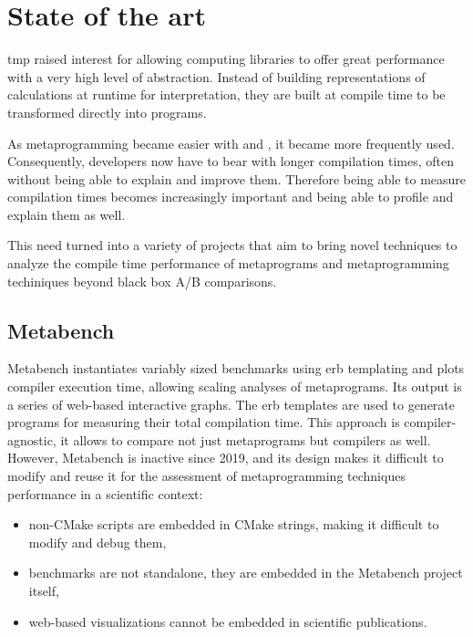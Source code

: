 \documentclass[../main]{subfiles}
\begin{document}
\section{
  State of the art
}

\cpp \gls{tmp} raised interest for allowing computing libraries
to offer great performance with a very high level of abstraction.
Instead of building representations of calculations at runtime for
interpretation, they are built at compile time to be transformed directly into
programs.

As metaprogramming became easier with  and ,
it became more frequently used.
Consequently, developers now have to bear with longer
compilation times, often without being able to explain and improve them.
Therefore being able to measure compilation times becomes increasingly important
and being able to profile and explain them as well.

This need turned into a variety of projects that aim to bring novel techniques
to analyze the compile time performance of \cpp metaprograms and metaprogramming
techiniques beyond black box A/B comparisons.

%

\subsection{
  Metabench
}

Metabench\cite{metabench} instantiates variably sized benchmarks using
\gls{erb} templating and plots compiler execution time, allowing
scaling analyses of metaprograms. Its output is a series of web-based
interactive graphs.
The \gls{erb} templates are used to generate \cpp programs for measuring their
total compilation time. This approach is compiler-agnostic, it allows to compare
not just metaprograms but compilers as well.
\\

However, Metabench is inactive since 2019, and its design makes it
difficult to modify and reuse it for the assessment of metaprogramming
techniques performance in a scientific context:

\begin{itemize}
\item
non-CMake scripts are embedded in CMake strings, making it difficult to modify
and debug them,

\item
benchmarks are not standalone, they are embedded in the Metabench
project itself,

\item
web-based visualizations cannot be embedded in scientific publications.

\end{itemize}
\end{document}
